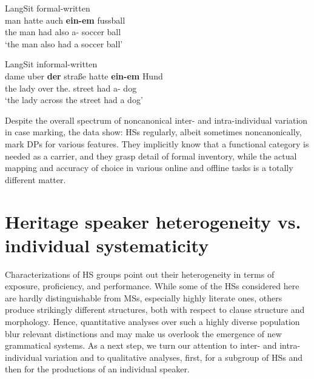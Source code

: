 \documentclass[output=paper]{langscibook}
\begin{document}
\ex LangSit formal-written\label{ex:tsehaye:8c}\\
 {man} {hatte} {auch} \textbf{{ein-em}} {fussball}\\
	 the man had also {a}-\Dat{} {soccer ball}\\
\glt ‘the man also had a soccer ball’

\ex LangSit informal-written\label{ex:tsehaye:8d}\\
 {dame} {uber} \textbf{{der}} {straße} {hatte} \textbf{{ein-em}} {Hund}\\
	 the lady over {the}.\Dat{} street had {a}-\Dat{} dog\\
\glt ‘the lady across the street had a dog’~
\z
\z

Despite the overall spectrum of noncanonical inter- and intra-individual variation in case marking, the data show: HSs regularly, albeit sometimes noncanonically, mark DPs for various features. They implicitly know that a functional category is needed as a carrier, and they grasp detail of formal inventory, while the actual mapping and accuracy of choice in various online and offline tasks is a totally different matter.

\section{Heritage speaker heterogeneity vs. individual systematicity}\label{sec:tsehaye:6}

Characterizations of HS groups point out their heterogeneity in terms of exposure, proficiency, and performance. While some of the HSs considered here are hardly distinguishable from MSs, especially highly literate ones, others produce strikingly different structures, both with respect to clause structure and morphology. Hence, quantitative analyses over such a highly diverse population blur relevant distinctions and may make us overlook the emergence of new grammatical systems. As a next step, we turn our attention to inter- and intra-individual variation and to qualitative analyses, first, for a subgroup of HSs and then for the productions of an individual speaker.
\end{document}
